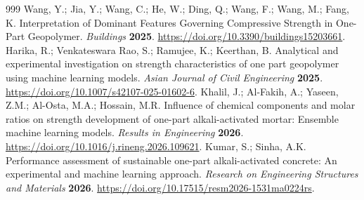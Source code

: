 \documentclass[materials,article,submit,pdftex,moreauthors]{Definitions/mdpi}
\begin{document}
\begin{thebibliography}{999}
Wang, Y.; Jia, Y.; Wang, C.; He, W.; Ding, Q.; Wang, F.; Wang, M.; Fang, K. Interpretation of Dominant Features Governing Compressive Strength in One-Part Geopolymer. {\em Buildings} {\bf 2025}. \url{https://doi.org/10.3390/buildings15203661}.
Harika, R.; Venkateswara Rao, S.; Ramujee, K.; Keerthan, B. Analytical and experimental investigation on strength characteristics of one part geopolymer using machine learning models. {\em Asian Journal of Civil Engineering} {\bf 2025}. \url{https://doi.org/10.1007/s42107-025-01602-6}.
Khalil, J.; Al-Fakih, A.; Yaseen, Z.M.; Al-Osta, M.A.; Hossain, M.R. Influence of chemical components and molar ratios on strength development of one-part alkali-activated mortar: Ensemble machine learning models. {\em Results in Engineering} {\bf 2026}. \url{https://doi.org/10.1016/j.rineng.2026.109621}.
Kumar, S.; Sinha, A.K. Performance assessment of sustainable one-part alkali-activated concrete: An experimental and machine learning approach. {\em Research on Engineering Structures and Materials} {\bf 2026}. \url{https://doi.org/10.17515/resm2026-1531ma0224rs}.
\end{thebibliography}
\end{document}

